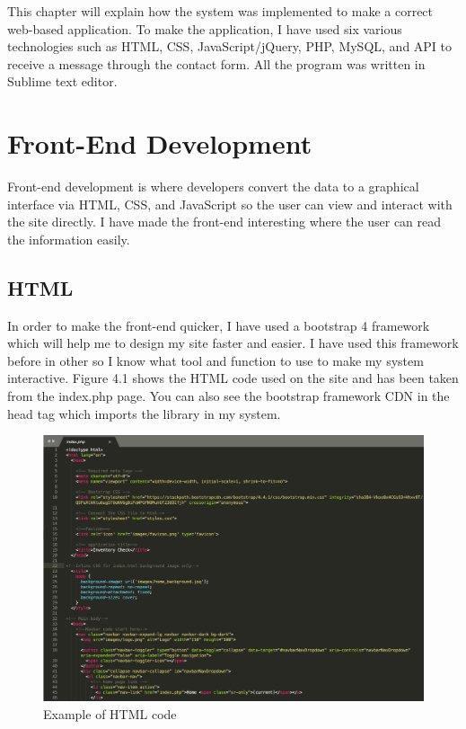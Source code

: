 This chapter will explain how the system was implemented to make a correct web-based application. To make the application, I have used six various technologies such as HTML, CSS, JavaScript/jQuery, PHP, MySQL, and API to receive a message through the contact form. All the program was written in Sublime text editor.

\section{Front-End Development}
Front-end development is where developers convert the data to a graphical interface via HTML, CSS, and JavaScript so the user can view and interact with the site directly. I have made the front-end interesting where the user can read the information easily.

\subsection{HTML}
In order to make the front-end quicker, I have used a bootstrap 4 framework which will help me to design my site faster and easier. I have used this framework before in other so I know what tool and function to use to make my system interactive. Figure 4.1 shows the HTML code used on the site and has been taken from the index.php page. You can also see the bootstrap framework CDN in the head tag which imports the library in my system.

\begin{figure}[H]
\centering
    \includegraphics[scale=0.33]
    {implement_image/html.png}
    \caption{Example of HTML code}
    \label{fig:Example of HTML code}
\end{figure}

